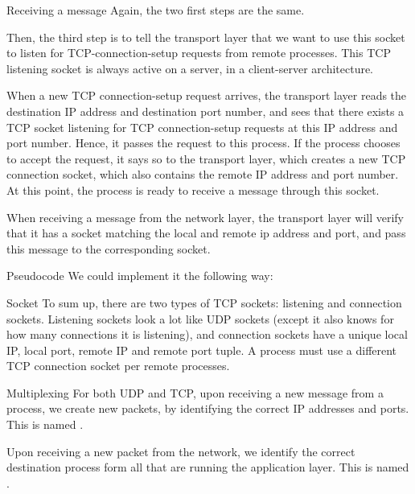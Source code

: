 \documentclass[a4paper]{article}
\begin{document}
\begin{parag}{Receiving a message}
    Again, the two first steps are the same. 

    Then, the third step is to tell the transport layer that we want to use this socket to listen for TCP-connection-setup requests from remote processes. This TCP listening socket is always active on a server, in a client-server architecture.

    When a new TCP connection-setup request arrives, the transport layer reads the destination IP address and destination port number, and sees that there exists a TCP socket listening for TCP connection-setup requests at this IP address and port number. Hence, it passes the request to this process. If the process chooses to accept the request, it says so to the transport layer, which creates a new TCP connection socket, which also contains the remote IP address and port number. At this point, the process is ready to receive a message through this socket.

    When receiving a message from the network layer, the transport layer will verify that it has a socket matching the local and remote ip address and port, and pass this message to the corresponding socket.

    \begin{subparag}{Pseudocode}
        We could implement it the following way:
    \end{subparag}
\end{parag}

\begin{parag}{Socket}
    To sum up, there are two types of TCP sockets: listening and connection sockets. Listening sockets look a lot like UDP sockets (except it also knows for how many connections it is listening), and connection sockets have a unique local IP, local port, remote IP and remote port tuple. A process must use a different TCP connection socket per remote processes.
\end{parag}

\begin{parag}{Multiplexing}
    For both UDP and TCP, upon receiving a new message from a process, we create new packets, by identifying the correct IP addresses and ports. This is named .

    Upon receiving a new packet from the network, we identify the correct destination process form all that are running the application layer. This is named .
\end{parag}
\end{document}
